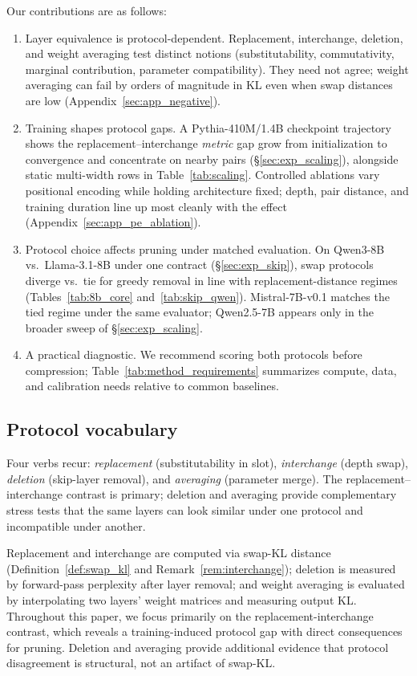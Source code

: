 \documentclass{article}
\begin{document}
Our contributions are as follows:
\begin{enumerate}
    \item Layer equivalence is protocol-dependent. Replacement, interchange, deletion, and weight averaging test distinct notions (substitutability, commutativity, marginal contribution, parameter compatibility). They need not agree; weight averaging can fail by orders of magnitude in KL even when swap distances are low (Appendix~\ref{sec:app_negative}).
    \item Training shapes protocol gaps. A Pythia-410M/1.4B checkpoint trajectory shows the replacement--interchange \emph{metric} gap grow from initialization to convergence and concentrate on nearby pairs (\S\ref{sec:exp_scaling}), alongside static multi-width rows in Table~\ref{tab:scaling}. Controlled ablations vary positional encoding while holding architecture fixed; depth, pair distance, and training duration line up most cleanly with the effect (Appendix~\ref{sec:app_pe_ablation}).
    \item Protocol choice affects pruning under matched evaluation. On Qwen3-8B vs.\ Llama-3.1-8B under one contract (\S\ref{sec:exp_skip}), swap protocols diverge vs.\ tie for greedy removal in line with replacement-distance regimes (Tables~\ref{tab:8b_core} and~\ref{tab:skip_qwen}). Mistral-7B-v0.1 matches the tied regime under the same evaluator; Qwen2.5-7B appears only in the broader sweep of \S\ref{sec:exp_scaling}.
    \item A practical diagnostic. We recommend scoring both protocols before compression; Table~\ref{tab:method_requirements} summarizes compute, data, and calibration needs relative to common baselines.
\end{enumerate}

\subsection{Protocol vocabulary}
\label{sec:taxonomy}
Four verbs recur: \emph{replacement} (substitutability in slot), \emph{interchange} (depth swap), \emph{deletion} (skip-layer removal), and \emph{averaging} (parameter merge). The replacement--interchange contrast is primary; deletion and averaging provide complementary stress tests that the same layers can look similar under one protocol and incompatible under another.

Replacement and interchange are computed via swap-KL distance (Definition~\ref{def:swap_kl} and Remark~\ref{rem:interchange}); deletion is measured by forward-pass perplexity after layer removal; and weight averaging is evaluated by interpolating two layers' weight matrices and measuring output KL. Throughout this paper, we focus primarily on the replacement-interchange contrast, which reveals a training-induced protocol gap with direct consequences for pruning. Deletion and averaging provide additional evidence that protocol disagreement is structural, not an artifact of swap-KL.
\end{document}
